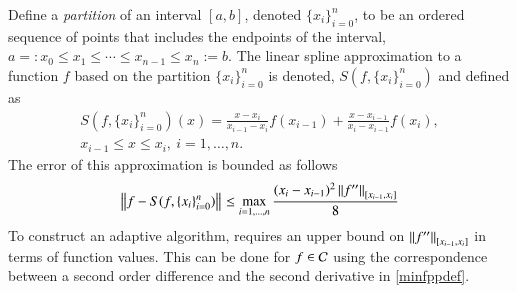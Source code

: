 \documentclass[review]{elsarticle}
\newcommand{\datasites}{\{x_i\}_{i=0}^n}
\begin{document}
Define a \emph{partition} of an interval $[a, b]$, denoted $\datasites$, to be an ordered sequence of points that includes the endpoints of the interval,  $a=:x_0 \le x_1 \le \cdots \le x_{n-1} \le x_{n}:=b$.   The linear spline approximation to a function $f$ based on the partition $\datasites$ is denoted, $S(f,\datasites)$ and defined as
\begin{multline} \label{splinedef}
S(f,\datasites)(x) =  \frac{x-x_i}{x_{i-1} - x_i} f(x_{i-1}) + \frac{x-x_{i-1}}{x_{i} - x_{i-1}}f(x_i), \\ x_{i-1} \le x \le x_i, \ i=1, \ldots, n.
\end{multline}
The error of this approximation is bounded as follows
\begin{equation} \label{appxerrbda}
\norm{f - S(f,\datasites)} \le \max_{i=1, \ldots, n} \frac{(x_i - x_{i-1})^2\norm[{[x_{i-1},x_i]}]{f''}}{8}
\end{equation}
To construct an adaptive algorithm, requires an upper bound on $\norm[{[x_{i-1},x_i]}]{f''}$ in terms of function values.  This can be done for $f \in \cc$ using the correspondence between a second order difference and the second derivative in \eqref{minfppdef}.
\end{document}
